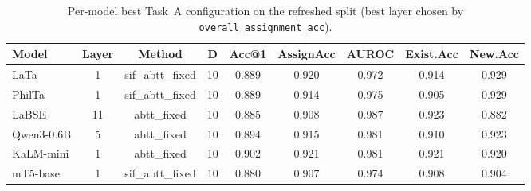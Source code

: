 \begin{table}
\caption{Per-model best Task~A configuration on the refreshed split (best layer chosen by \texttt{overall\_assignment\_acc}).}
\label{tab:taskA_per_model}
\begin{tabular}{lcccccccc}
\toprule
Model & Layer & Method & D & Acc@1 & AssignAcc & AUROC & Exist.Acc & New.Acc \\
\midrule
LaTa & 1 & sif\_abtt\_fixed & 10 & 0.889 & 0.920 & 0.972 & 0.914 & 0.929 \\
PhilTa & 1 & sif\_abtt\_fixed & 10 & 0.889 & 0.914 & 0.975 & 0.905 & 0.929 \\
LaBSE & 11 & abtt\_fixed & 10 & 0.885 & 0.908 & 0.987 & 0.923 & 0.882 \\
Qwen3-0.6B & 5 & abtt\_fixed & 10 & 0.894 & 0.915 & 0.981 & 0.910 & 0.923 \\
KaLM-mini & 1 & abtt\_fixed & 10 & 0.902 & 0.921 & 0.981 & 0.921 & 0.920 \\
mT5-base & 1 & sif\_abtt\_fixed & 10 & 0.880 & 0.907 & 0.974 & 0.908 & 0.904 \\
\bottomrule
\end{tabular}
\end{table}
